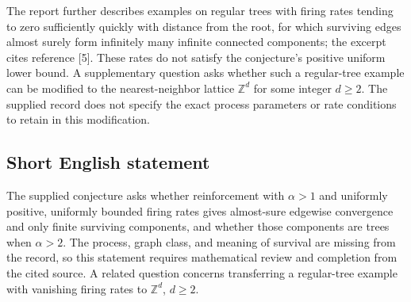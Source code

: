 \documentclass[11pt]{article}
\newcommand{\Z}{\mathbb{Z}}
\begin{document}
The report further describes examples on regular trees with firing rates tending to zero sufficiently quickly with distance from the root, for which surviving edges almost surely form infinitely many infinite connected components; the excerpt cites reference [5]. These rates do not satisfy the conjecture's positive uniform lower bound. A supplementary question asks whether such a regular-tree example can be modified to the nearest-neighbor lattice \(\Z^d\) for some integer \(d\ge2\). The supplied record does not specify the exact process parameters or rate conditions to retain in this modification.
\subsection{Short English statement}
The supplied conjecture asks whether reinforcement with \(\alpha>1\) and uniformly positive, uniformly bounded firing rates gives almost-sure edgewise convergence and only finite surviving components, and whether those components are trees when \(\alpha>2\). The process, graph class, and meaning of survival are missing from the record, so this statement requires mathematical review and completion from the cited source. A related question concerns transferring a regular-tree example with vanishing firing rates to \(\Z^d\), \(d\ge2\).
\end{document}
